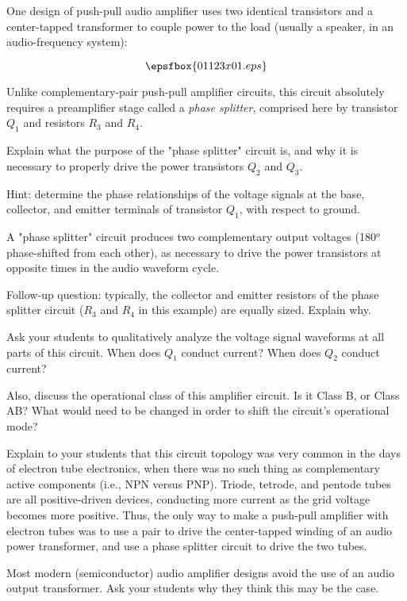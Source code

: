 

One design of push-pull audio amplifier uses two identical transistors and a center-tapped transformer to couple power to the load (usually a speaker, in an audio-frequency system):

$$\epsfbox{01123x01.eps}$$

Unlike complementary-pair push-pull amplifier circuits, this circuit absolutely requires a preamplifier stage called a {\it phase splitter}, comprised here by transistor $Q_1$ and resistors $R_3$ and $R_4$.

Explain what the purpose of the "phase splitter" circuit is, and why it is necessary to properly drive the power transistors $Q_2$ and $Q_3$.  

\vskip 10pt

Hint: determine the phase relationships of the voltage signals at the base, collector, and emitter terminals of transistor $Q_1$, with respect to ground.







A "phase splitter" circuit produces two complementary output voltages (180$^{o}$ phase-shifted from each other), as necessary to drive the power transistors at opposite times in the audio waveform cycle.

\vskip 10pt

Follow-up question: typically, the collector and emitter resistors of the phase splitter circuit ($R_3$ and $R_4$ in this example) are equally sized.  Explain why.







Ask your students to qualitatively analyze the voltage signal waveforms at all parts of this circuit.  When does $Q_1$ conduct current?  When does $Q_2$ conduct current?

Also, discuss the operational class of this amplifier circuit.  Is it Class B, or Class AB?  What would need to be changed in order to shift the circuit's operational mode?

Explain to your students that this circuit topology was very common in the days of electron tube electronics, when there was no such thing as complementary active components (i.e., NPN versus PNP).  Triode, tetrode, and pentode tubes are all positive-driven devices, conducting more current as the grid voltage becomes more positive.  Thus, the only way to make a push-pull amplifier with electron tubes was to use a pair to drive the center-tapped winding of an audio power transformer, and use a phase splitter circuit to drive the two tubes.

Most modern (semiconductor) audio amplifier designs avoid the use of an audio output transformer.  Ask your students why they think this may be the case.




